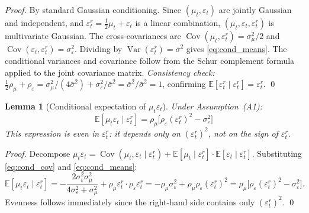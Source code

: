 \documentclass[12pt,a4paper]{article}
\newtheorem{lemma}[theorem]{Lemma}
\theoremstyle{definition}
\begin{document}
\begin{proof}
By standard Gaussian conditioning. Since $(\mu_t, \varepsilon_t)$
are jointly Gaussian and independent, and $\varepsilon^r_t =
\frac{1}{2}\mu_t + \varepsilon_t$ is a linear combination,
$(\mu_t, \varepsilon_t, \varepsilon^r_t)$ is multivariate Gaussian.
The cross-covariances are $\operatorname{Cov}(\mu_t, \varepsilon^r_t)
= \sigma^2_\mu/2$ and $\operatorname{Cov}(\varepsilon_t,
\varepsilon^r_t) = \sigma^2_\varepsilon$. Dividing by
$\operatorname{Var}(\varepsilon^r_t) = \bar\sigma^2$ gives
\eqref{eq:cond_means}. The conditional variances and covariance
follow from the Schur complement formula applied to the joint
covariance matrix. \textit{Consistency check:}
$\frac{1}{2}\rho_\mu + \rho_\varepsilon =
\sigma^2_\mu/(4\bar\sigma^2) + \sigma^2_\varepsilon/\bar\sigma^2
= \bar\sigma^2/\bar\sigma^2 = 1$, confirming
$\mathbb{E}[\varepsilon^r_t \mid \varepsilon^r_t] = \varepsilon^r_t$.
\qed
\end{proof}

\begin{lemma}[Conditional expectation of $\mu_t\varepsilon_t$]
\label{lem:cond_mueps}
Under Assumption~(A1):
\begin{equation}
  \mathbb{E}[\mu_t\varepsilon_t \mid \varepsilon^r_t]
  = \rho_\mu\bigl[\rho_\varepsilon(\varepsilon^r_t)^2
    - \sigma^2_\varepsilon\bigr]
  \label{eq:cond_mueps}
\end{equation}
This expression is \emph{even} in $\varepsilon^r_t$: it depends only
on $(\varepsilon^r_t)^2$, not on the sign of $\varepsilon^r_t$.
\end{lemma}

\begin{proof}
Decompose $\mu_t\varepsilon_t = \operatorname{Cov}(\mu_t,
\varepsilon_t \mid \varepsilon^r_t) + \mathbb{E}[\mu_t \mid
\varepsilon^r_t]\cdot\mathbb{E}[\varepsilon_t \mid \varepsilon^r_t]$.
Substituting \eqref{eq:cond_cov} and \eqref{eq:cond_means}:
\[
\mathbb{E}[\mu_t\varepsilon_t \mid \varepsilon^r_t]
= -\frac{2\sigma^2_\varepsilon\sigma^2_\mu}
       {4\sigma^2_\varepsilon + \sigma^2_\mu}
  + \rho_\mu\varepsilon^r_t \cdot \rho_\varepsilon\varepsilon^r_t
= -\rho_\mu\sigma^2_\varepsilon
  + \rho_\mu\rho_\varepsilon(\varepsilon^r_t)^2
= \rho_\mu\bigl[\rho_\varepsilon(\varepsilon^r_t)^2
  - \sigma^2_\varepsilon\bigr].
\]
Evenness follows immediately since the right-hand side contains only
$(\varepsilon^r_t)^2$.
\qed
\end{proof}
\end{document}

